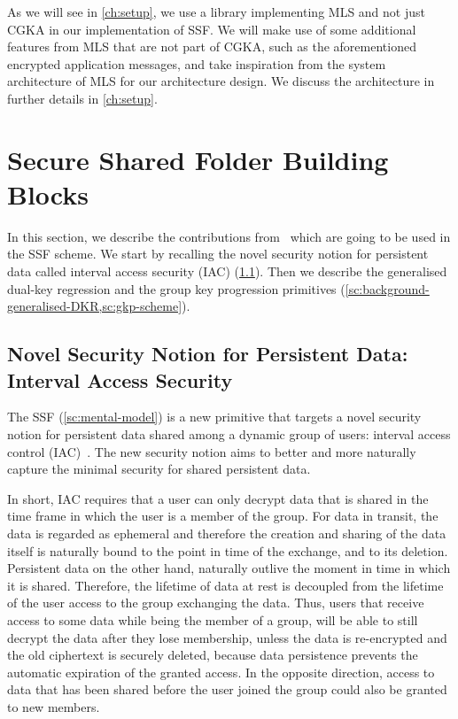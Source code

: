 As we will see in \cref{ch:setup}, we use a library implementing MLS and not just CGKA in our implementation of SSF.
We will make use of some additional features from MLS that are not part of CGKA, such as the
aforementioned encrypted application messages,
and take inspiration from the system architecture of MLS for our architecture design.
We discuss the architecture in further details in \cref{ch:setup}.

\section{Secure Shared Folder Building Blocks}\label{sc:SSF}

In this section, we describe the
contributions from~\cite{GKP}
which are going to be used
in the SSF scheme.
We start by recalling the novel security notion for persistent
data called interval access security (IAC) (\cref{sc:iac}).
Then we describe the generalised dual-key regression and the group key progression primitives
(\cref{sc:background-generalised-DKR,sc:gkp-scheme}).

\subsection{Novel Security Notion for Persistent Data: Interval Access Security}\label{sc:iac}

The SSF (\cref{sc:mental-model}) is a new primitive that targets a novel security 
notion for persistent data shared among a dynamic 
group of users: interval access control (IAC)~\cite{GKP}.
The new security notion aims to better and more naturally
capture the minimal security for shared persistent data.

In short, IAC requires that a user can only decrypt data that
is shared in the time frame in which the user is a member
of the group. For data in transit, the data is regarded as
ephemeral and therefore the creation and sharing of the data
itself is naturally bound to the point in time of the exchange,
and to its deletion. Persistent data on the other hand, naturally
outlive the moment in time in which it is shared.
Therefore, the lifetime of data at rest is decoupled from the
lifetime of the user access to the group exchanging the data.
Thus, users that receive access to some data while being the
member of a group, will be able to still decrypt the data
after they lose membership, unless the data is re-encrypted
and the old ciphertext is securely deleted, because data persistence prevents the automatic expiration of the granted access.
In the opposite direction, access to data that has been
shared before the user joined the group could also be granted
to new members.

